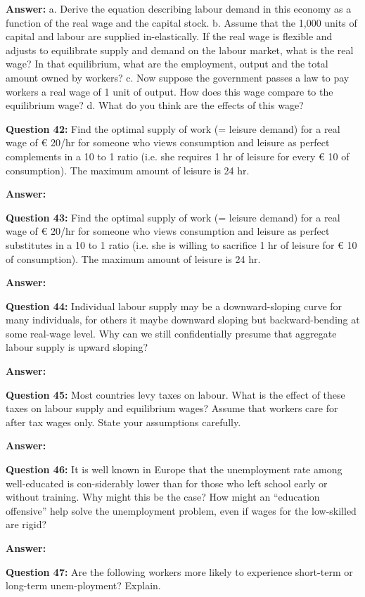 \documentclass[a4paper, 11pt]{article}
\begin{document}
\textbf{Answer:}
a. Derive the equation describing labour demand in this economy as a function of the real wage and the capital stock.
b. Assume that the 1,000 units of capital and labour are supplied in-elastically. If the real wage is flexible and adjusts to equilibrate supply and demand on the labour market, what is the real wage? In that equilibrium, what are the employment, output and the total amount owned by workers?
c. Now suppose the government passes a law to pay workers a real wage of 1 unit of output. How does this wage compare to the equilibrium wage?
d. What do you think are the effects of this wage?

\textbf{Question 42:} Find the optimal supply of work (= leisure demand) for a real wage of € 20/hr for someone who views consumption and leisure as perfect complements in a 10 to 1 ratio (i.e. she requires 1 hr of leisure for every € 10 of consumption). The maximum amount of leisure is 24 hr.

\textbf{Answer:}

\textbf{Question 43:} Find the optimal supply of work (= leisure demand) for a real wage of € 20/hr for someone who views consumption and leisure as perfect substitutes in a 10 to 1 ratio (i.e. she is willing to sacrifice 1 hr of leisure for € 10 of consumption). The maximum amount of leisure is 24 hr.

\textbf{Answer:}

\textbf{Question 44:} Individual labour supply may be a downward-sloping curve for many individuals, for others it maybe downward sloping but backward-bending at some real-wage level. Why can we still confidentially presume that aggregate labour supply is upward sloping?

\textbf{Answer:}

\textbf{Question 45:} Most countries levy taxes on labour. What is the effect of these taxes on labour supply and equilibrium wages? Assume that workers care for after tax wages only. State your assumptions carefully.

\textbf{Answer:}

\textbf{Question 46:} It is well known in Europe that the unemployment rate among well-educated is con-siderably lower than for those who left school early or without training. Why might this be the case? How might an “education offensive” help solve the unemployment problem, even if wages for the low-skilled are rigid?

\textbf{Answer:}

\textbf{Question 47:} Are the following workers more likely to experience short-term or long-term unem-ployment? Explain.
\end{document}
